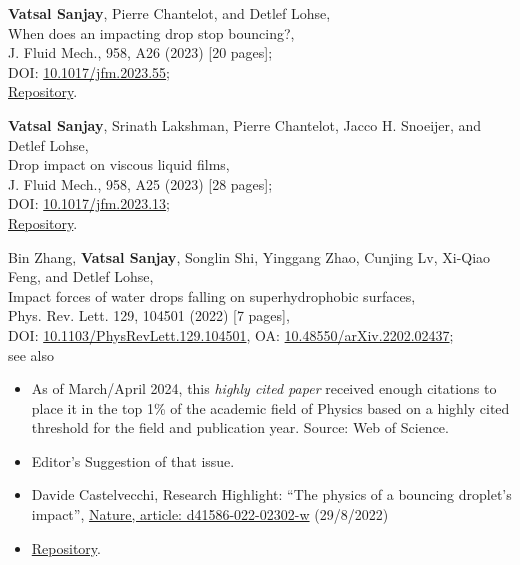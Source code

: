 \documentclass[10pt,a4paper,colorlinks,linkcolor=blue,urlcolor=blue,citecolor=blue]{moderncv}
\begin{document}
\begin{enumerate}[leftmargin=1.5em,label=\textbf{[\arabic*]}]
	\item \textbf{Vatsal Sanjay}, Pierre Chantelot, and Detlef Lohse,\\
	When does an impacting drop stop bouncing?,\\
	J. Fluid Mech., 958, A26 (2023) [20 pages];\\
	\faFile\hspace{0.2em}DOI: \href{https://doi.org/10.1017/jfm.2023.55}{10.1017/jfm.2023.55};\\
	\faGithub\hspace{0.2em}\href{https://github.com/comphy-lab/Drop-Impact}{Repository}.

	\item \textbf{Vatsal Sanjay}, Srinath Lakshman, Pierre Chantelot, Jacco H. Snoeijer, and Detlef Lohse,\\
	Drop impact on viscous liquid films,\\
	J. Fluid Mech., 958, A25 (2023) [28 pages];\\
	\faFile\hspace{0.2em}DOI: \href{https://doi.org/10.1017/jfm.2023.13}{10.1017/jfm.2023.13};\\
	\faGithub\hspace{0.2em}\href{https://github.com/VatsalSy/Drop-impact-on-viscous-liquid-films}{Repository}.

	\item Bin Zhang, \textbf{Vatsal Sanjay}, Songlin Shi, Yinggang Zhao, Cunjing Lv, Xi-Qiao Feng, and Detlef Lohse,\\
	Impact forces of water drops falling on superhydrophobic surfaces,\\
	Phys. Rev. Lett. 129, 104501 (2022) [7 pages],\\
	\faLock\hspace{0.2em}DOI: \href{https://doi.org/10.1103/PhysRevLett.129.104501}{10.1103/PhysRevLett.129.104501}, \faFile\hspace{0.2em}OA: \href{https://doi.org/10.48550/arXiv.2202.02437}{10.48550/arXiv.2202.02437};\\
	see also
	\begin{itemize}
		\item
		\faChartLine\hspace{0.2em}As of March/April 2024, this \textit{highly cited paper} received enough citations to place it in the top 1\% of the academic field of Physics based on a highly cited threshold for the field and publication year. Source: Web of Science.
		\item
		\faStar\hspace{0.2em}Editor's Suggestion of that issue.
		\item
		Davide Castelvecchi, Research Highlight: ``The physics of a bouncing droplet's impact'', \href{https://www.nature.com/articles/d41586-022-02302-w}{Nature, article: d41586-022-02302-w} (29/8/2022)
		\item
		\faGithub\hspace{0.2em}\href{https://github.com/VatsalSy/Impact-forces-of-water-drops-falling-on-superhydrophobic-surfaces}{Repository}.
	\end{itemize}


\end{enumerate}
\end{document}
